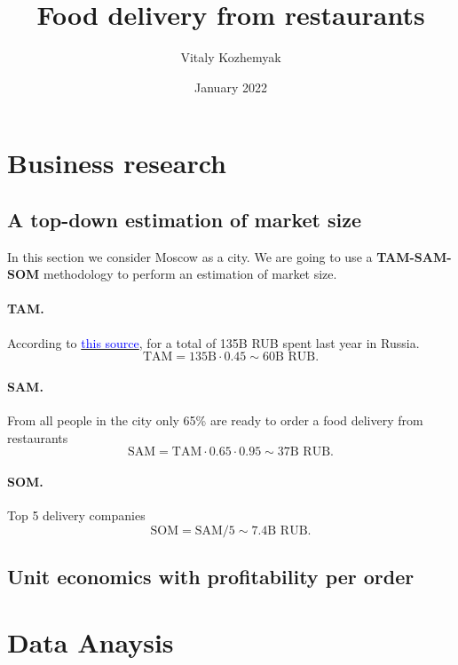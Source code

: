 \documentclass[11pt]{article}
\title{Food delivery from restaurants}
\author{Vitaly Kozhemyak}
\date{January 2022}
\begin{document}
\maketitle
\section{Business research}
\subsection{A top-down estimation of market size}
In this section we consider Moscow as a city. We are going to use a \textbf{TAM-SAM-SOM} methodology to perform an estimation of market size.
\paragraph{TAM.}
According to \href{https://acdn.tinkoff.ru/static/documents/market-for-delivery-food-groceries-and-ready-made-rations.pdf}{\textcolor{blue}{this source}}, for a total of 135B RUB spent last year in Russia. 
$$
\text{TAM} = 135 \text{B} \cdot 0.45 \sim 60 \text{B RUB.}
$$
\paragraph{SAM.}
From all people in the city only 65\% are ready to order a food delivery from restaurants
$$
\text{SAM} = \text{TAM} \cdot 0.65 \cdot 0.95 \sim 37 \text{B RUB.}
$$
\paragraph{SOM.}
Top 5 delivery companies
$$
\text{SOM} = \text{SAM} / 5 \sim 7.4 \text{B RUB.}
$$
\subsection{Unit economics with profitability per order}

\section{Data Anaysis}
\end{document}
